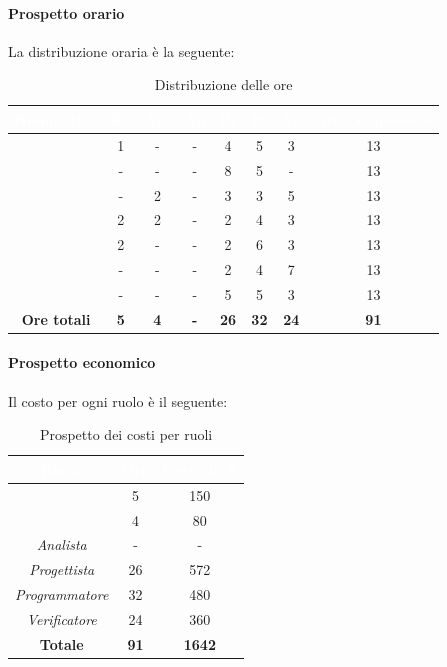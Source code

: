 \paragraph*{Prospetto orario}
La distribuzione oraria è la seguente:
\begin{table}[H]
	\begin{center}
		\begin{tabular}{ |c c c c c c c c| }
			\rowcolor{darkblue} 
			\textcolor{white}{\textbf{Nominativo}} & \textcolor{white}{\textbf{Re}} & \textcolor{white}{\textbf{Am}} & \textcolor{white}{\textbf{An}} & \textcolor{white}{\textbf{Pt}} & \textcolor{white}{\textbf{Pr}} & \textcolor{white}{\textbf{Ve}} & \textcolor{white}{\textbf{Ore Complessive}} \\ \hline
				\BL 	& 1  	& -  	& - 	& 4 	& 5 	& 3 	& 13 \\ \hline
			\FF 	& -  	& -  	& - 	& 8 	& 5 	& -  	& 13 \\ \hline
			\MM 	& -  	& 2  	& - 	& 3 	& 3 	& 5 	& 13 \\ \hline
			\PC 	& 2 	& 2  	& - 	& 2	& 4 	& 3 	& 13 \\ \hline
			\TG 	& 2  	& -		& - 	& 2 	& 6 	& 3 	& 13 \\ \hline
			\TL 	& -  	& - 	& - 	& 2 	& 4 	& 7 	& 13 \\ \hline
			\VD 	& -  	& -  	& - 	& 5 	& 5 	& 3 	& 13 \\ \hline
			\textbf{Ore totali} & \textbf{5} & \textbf{4} & \textbf{-} & \textbf{26} & \textbf{32} & \textbf{24} & \textbf{91} \\ \hline
		\end{tabular}
		\caption{Distribuzione delle ore}
	\end{center}
\end{table}
\paragraph*{Prospetto economico}
Il costo per ogni ruolo è il seguente:
\begin{table}[H]
	\begin{center}
		\begin{tabular}{ |c c c| }
			\rowcolor{darkblue} 
			\textcolor{white}{\textbf{Ruolo}} & \textcolor{white}{\textbf{Ore}} & \textcolor{white}{\textbf{Costo in €}}\\ \hline
		{\Responsabile} 			& 5 	& 150 \\ \hline
		{\Amministratore}		 	& 4 	& 80 \\ \hline
		\textit{Analista} 			& - 	& - \\ \hline
		\textit{Progettista} 		& 26 	& 572 \\ \hline
		\textit{Programmatore}  	& 32 	& 480 \\ \hline
		\textit{Verificatore} 		& 24 	& 360 \\ \hline
		\textbf{Totale} & \textbf{91} & \textbf{1642} \\ \hline
		\end{tabular}
		\caption{Prospetto dei costi per ruoli}
	\end{center}
\end{table}
